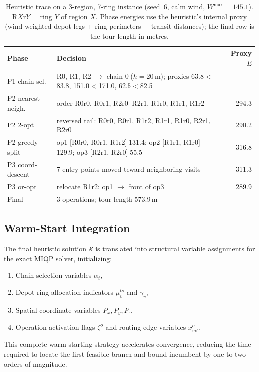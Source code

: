 \documentclass[12pt]{elsarticle}
\begin{document}
\begin{table}[t]
  \centering
  \caption{Heuristic trace on a 3-region, 7-ring instance (seed~6, calm wind, $W^{\max}=145.1$). R$X$r$Y$ = ring $Y$ of region $X$. Phase energies use the heuristic's internal proxy (wind-weighted depot legs + ring perimeters + transit distances); the final row is the tour length in metres.}
  \label{tab:heuristic-trace}
  \begin{tabular}{lp{7.2cm}r}
    \toprule
    Phase & Decision & Proxy $E$ \\
    \midrule
    P1 chain sel.\ & R0, R1, R2 $\to$ chain 0 ($h{=}20$\,m); proxies 63.8${<}$83.8, 151.0${<}$171.0, 62.5${<}$82.5 & --- \\
    P2 nearest neigh.\ & order R0r0, R0r1, R2r0, R2r1, R1r0, R1r1, R1r2 & 294.3 \\
    P2 2-opt & reversed tail: R0r0, R0r1, R1r2, R1r1, R1r0, R2r1, R2r0 & 290.2 \\
    P2 greedy split & op1 [R0r0, R0r1, R1r2] 131.4; op2 [R1r1, R1r0] 129.9; op3 [R2r1, R2r0] 55.5 & 316.8 \\
    P3 coord-descent & 7 entry points moved toward neighboring visits & 311.3 \\
    P3 or-opt & relocate R1r2: op1 $\to$ front of op3 & 289.9 \\
    Final & 3 operations; tour length 573.9\,m & --- \\
    \bottomrule
  \end{tabular}
\end{table}

\subsection{Warm-Start Integration}\label{sec:build}

The final heuristic solution $\mathcal{S}$ is translated into structural variable assignments for the exact MIQP solver, initializing:
\begin{enumerate}
	\item Chain selection variables $\alpha_t$,
	\item Depot-ring allocation indicators $\mu_v^{ts}$ and $\gamma_v$,
	\item Spatial coordinate variables $P_x, P_y, P_z$,
	\item Operation activation flags $\zeta^o$ and routing edge variables $x_{vv'}^o$.
\end{enumerate}
This complete warm-starting strategy accelerates convergence, reducing the time required to locate the first feasible branch-and-bound incumbent by one to two orders of magnitude.
\end{document}
